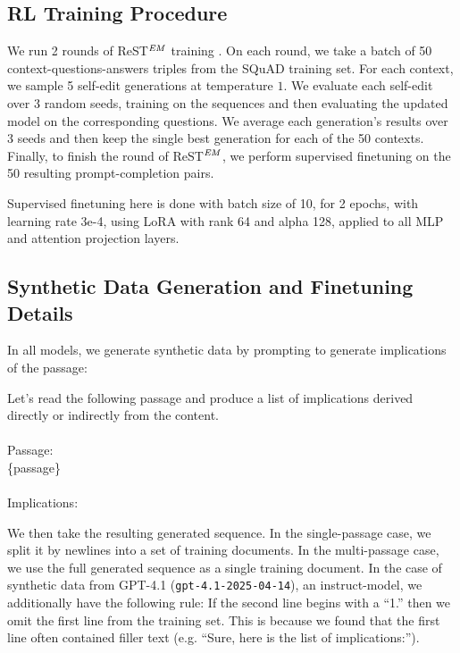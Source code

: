 \documentclass{article}
\begin{document}
\subsection{RL Training Procedure}

We run 2 rounds of ReST$^\text{\textit{EM}}$ training \cite{singh2023beyond}. On each round, we take a batch of 50 context-questions-answers triples from the SQuAD training set. For each context, we sample 5 self-edit generations at temperature $1$. We evaluate each self-edit over 3 random seeds, training on the sequences and then evaluating the updated model on the corresponding questions. We average each generation's results over 3 seeds and then keep the single best generation for each of the 50 contexts. Finally, to finish the round of ReST$^\text{\textit{EM}}$, we perform supervised finetuning on the 50 resulting prompt-completion pairs.

Supervised finetuning here is done with batch size of 10, for 2 epochs, with learning rate 3e-4, using LoRA \citep{hu2022lora} with rank 64 and alpha 128, applied to all MLP and attention projection layers.

\subsection{Synthetic Data Generation and Finetuning Details}

In all models, we generate synthetic data by prompting to generate implications of the passage:

\begin{tcolorbox}
Let's read the following passage and produce a list of implications derived directly or indirectly from the content. \\ \\
Passage: \\ \{passage\} \\ \\
Implications:
\end{tcolorbox}

We then take the resulting generated sequence. In the single-passage case, we split it by newlines into a set of training documents. In the multi-passage case, we use the full generated sequence as a single training document. In the case of synthetic data from GPT-4.1 (\texttt{gpt-4.1-2025-04-14}), an instruct-model, we additionally have the following rule: If the second line begins with a ``1.'' then we omit the first line from the training set. This is because we found that the first line often contained filler text (e.g. ``Sure, here is the list of implications:'').
\end{document}
